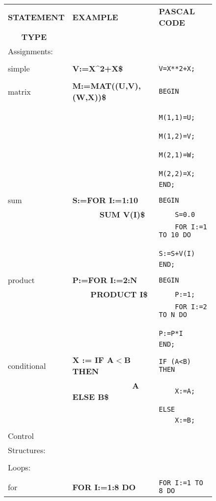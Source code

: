 \begin{figure}
\begin{center}
\begin{tabular}{||l|l|l||}\hline\hline
{\bf STATEMENT} & {\bf EXAMPLE} & {\bf PASCAL CODE} \\
{\bf \ \ \  TYPE} & & \\ \hline\hline
Assignments: & &\\
& & \\
    simple     &{\bf V:=X\^{}2+X\$} &\verb!V=X**2+X;!\\
& & \\
    matrix     &{\bf M:=MAT((U,V),(W,X))\$} &\verb!BEGIN!\\
& &\verb!    M(1,1)=U;!\\
& &\verb!    M(1,2)=V;!\\
& &\verb!    M(2,1)=W;!\\
& &\verb!    M(2,2)=X;!\\
& &\verb!END;!\\
& & \\
    sum &{\bf S:=FOR I:=1:10} &\verb!BEGIN!\\
&{\bf\ \ \ \ \ \ SUM V(I)\$} &\verb!    S=0.0!\\
& &\verb!    FOR I:=1 TO 10 DO!\\
& &\verb!        S:=S+V(I)!\\
& &\verb!END;!\\
& & \\
    product    &{\bf P:=FOR I:=2:N} &\verb!BEGIN!\\
&{\bf \ \ \ \ PRODUCT I\$} &\verb!    P:=1;!\\
& &\verb!    FOR I:=2 TO N DO!\\
& &\verb!        P:=P*I!\\
& &\verb!END;!\\
& & \\
conditional & {\bf X := IF A$<$B THEN} &\verb!IF (A<B) THEN!\\
& \ \ \ \ \ \ {\bf \ \ \ \ \ \ \ \ A ELSE B\$} &\verb!    X:=A;!\\
& &\verb!ELSE!\\
& &\verb!    X:=B;!\\
& & \\ \hline
Control & & \\
Structures: & &\\
& & \\
  Loops: & &\\
& &\\
    for &{\bf FOR I:=1:8 DO} &\verb!FOR I:=1 TO 8 DO!\\

\end{tabular}
\end{center}
\end{figure}
